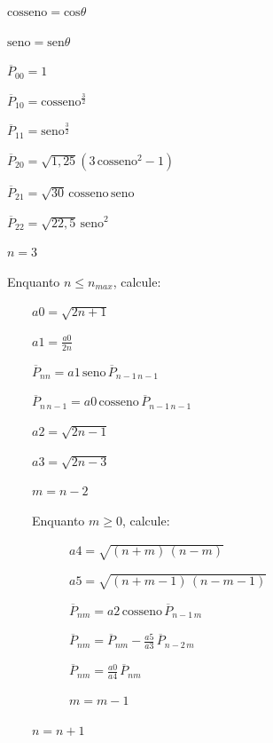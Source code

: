 \documentclass[10pt,a4paper,fleqn]{article}
\begin{document}
\begin{minipage}{20em}

\begin{flushleft}

$\text{cosseno} = \text{cos}\theta$

$\text{seno} = \text{sen}\theta$

$\overline{P}_{00} = 1$

$\overline{P}_{10} = \text{cosseno}^{\frac{3}{2}}$

$\overline{P}_{11} = \text{seno}^{\frac{3}{2}}$

$\overline{P}_{20} = \sqrt{1,25} 
                     \left(3 \, \text{cosseno}^{2} - 1
                     \right)$

$\overline{P}_{21} = \sqrt{30} \, \text{cosseno} \, \text{seno}$

$\overline{P}_{22} = \sqrt{22,5} \, \text{seno}^{2}$

$n = 3$

Enquanto $n \leq n_{max}$, calcule:

    $\quad\quad a0 = \sqrt{2n + 1}$

    $\quad\quad a1 = \frac{a0}{2n}$

    $\quad\quad \overline{P}_{nn} = a1 \, \text{seno} \, \overline{P}_{n-1 \, n-1}$
    
    $\quad\quad \overline{P}_{n \, n-1} = a0 \, \text{cosseno} \, \overline{P}_{n-1 \, n-1}$
    
    $\quad\quad a2 = \sqrt{2n - 1}$
    
    $\quad\quad a3 = \sqrt{2n - 3}$
    
    $\quad\quad m = n - 2$    
    
    $\quad\quad$Enquanto $m \geq 0$, calcule:
    
    $\quad\quad\quad\quad\quad a4 = \sqrt{(n+m)\,(n-m)}$
    
    $\quad\quad\quad\quad\quad a5 = \sqrt{(n+m-1)\,(n-m-1)}$
    
    $\quad\quad\quad\quad\quad \overline{P}_{nm} = a2 \, \text{cosseno} \, \overline{P}_{n-1 \, m}$
    
    $\quad\quad\quad\quad\quad \overline{P}_{nm} = \overline{P}_{nm} - \frac{a5}{a3} \, \overline{P}_{n-2 \, m}$
    
    $\quad\quad\quad\quad\quad \overline{P}_{nm} = \frac{a0}{a4} \, \overline{P}_{nm}$
    
    $\quad\quad\quad\quad\quad m = m - 1$

$\quad\quad n = n + 1$
    
\end{flushleft}

\end{minipage}
\end{document}
